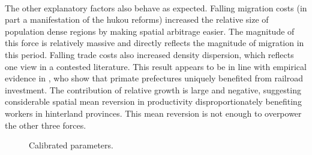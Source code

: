 \documentclass[]{article}
\theoremstyle{plain}
\begin{document}
\paragraph*{}
The other explanatory factors also behave as expected. Falling migration costs (in part a manifestation of the hukou reforms) increased the relative size of population dense regions by making spatial arbitrage easier. The magnitude of this force is relatively massive and directly reflects the magnitude of migration in this period. Falling trade costs also increased density dispersion, which reflects one view in a contested literature. This result appears to be in line with empirical evidence in \cite{bsetal2020}, who show that primate prefectures uniquely benefited from railroad investment. The contribution of relative growth is large and negative, suggesting considerable spatial mean reversion in productivity disproportionately benefiting workers in hinterland provinces. This mean reversion is not enough to overpower the other three forces. 
	\begin{figure}[h]
	\small	
	\centering	
	\caption{Calibrated parameters.}
	\label{fig:calibratedparameters} 
	\end{figure}
\end{document}
